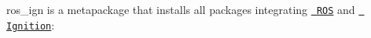 {\ttfamily ros\+\_\+ign} is a metapackage that installs all packages integrating \href{http://www.ros.org/}{\texttt{ R\+OS}} and \href{https://ignitionrobotics.org}{\texttt{ Ignition}}\+: 